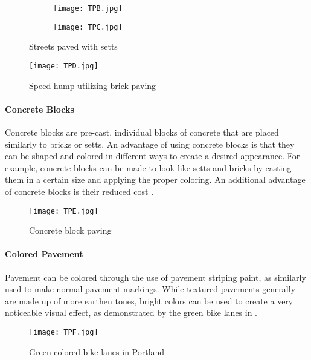 \begin{figure}[!htbp]
\centering
	\begin{subfigure}[t]{0.4\textwidth}
		\texttt{[image: TPB.jpg]}
	\end{subfigure}
	\begin{subfigure}[t]{0.4\textwidth}
		\texttt{[image: TPC.jpg]}
	\end{subfigure}
\caption{Streets paved with setts}\label{fig:TPBC}
\end{figure}



\begin{figure}[!htbp]
\centering
\texttt{[image: TPD.jpg]}
\caption[Speed hump utilizing brick paving]{Speed hump utilizing brick paving}\label{fig:TPD}
\end{figure}

\paragraph{Concrete Blocks} Concrete blocks are pre-cast, individual blocks of concrete that are placed similarly to bricks or setts. An advantage of using concrete blocks is that they can be shaped and colored in different ways to create a desired appearance. For example, concrete blocks can be made to look like setts and bricks by casting them in a certain size and applying the proper coloring. An additional advantage of concrete blocks is their reduced cost \cite{TP5}.

\begin{figure}[!htbp]
\centering
\texttt{[image: TPE.jpg]}
\caption[Concrete block paving]{Concrete block paving}\label{fig:TPE}
\end{figure}

\paragraph{Colored Pavement}Pavement can be colored through the use of pavement striping paint, as similarly used to make normal pavement markings. While textured pavements generally are made up of more earthen tones, bright colors can be used to create a very noticeable visual effect, as demonstrated by the green bike lanes in .

\begin{figure}[!htbp]
\centering
\texttt{[image: TPF.jpg]}
\caption[Green-colored bike lanes in Portland]{Green-colored bike lanes in Portland}\label{fig:TPF}
\end{figure}


